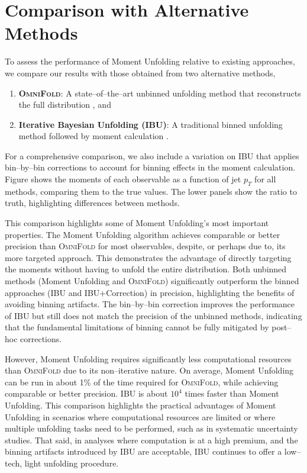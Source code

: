 \section{Comparison with Alternative Methods}
    To assess the performance of Moment Unfolding relative to existing approaches, we compare our results with those obtained from two alternative methods,
    \begin{enumerate}
        \item \textbf{\textsc{OmniFold}}: A state--of--the--art unbinned unfolding method that reconstructs the full distribution , and 
        \item \textbf{Iterative Bayesian Unfolding (IBU)}: A traditional binned unfolding method followed by moment calculation .
    \end{enumerate}
    For a comprehensive comparison, we also include a variation on IBU that applies bin--by--bin corrections to account for binning effects in the moment calculation.
    Figure  shows the moments of each observable as a function of jet $p_T$ for all methods, comparing them to the true values.
    The lower panels show the ratio to truth, highlighting differences between methods.

    This comparison highlights some of Moment Unfolding's most important properties.
    The Moment Unfolding algorithm achieves comparable or better precision than \textsc{\textsc{OmniFold}} for most observables, despite, or perhaps due to, its more targeted approach.
    This demonstrates the advantage of directly targeting the moments without having to unfold the entire distribution.
    Both unbinned methods (Moment Unfolding and \textsc{\textsc{OmniFold}}) significantly outperform the binned approaches (IBU and IBU+Correction) in precision, highlighting the benefits of avoiding binning artifacts.
    The bin--by--bin correction improves the performance of IBU but still does not match the precision of the unbinned methods, indicating that the fundamental limitations of binning cannot be fully mitigated by post--hoc corrections.
    
    However, Moment Unfolding requires significantly less computational resources than \textsc{\textsc{OmniFold}} due to its non--iterative nature.
    On average, Moment Unfolding can be run in about 1\% of the time required for \textsc{\textsc{OmniFold}}, while achieving comparable or better precision.
    IBU is about \(10^4\) times faster than Moment Unfolding.
    This comparison highlights the practical advantages of Moment Unfolding in scenarios where computational resources are limited or where multiple unfolding tasks need to be performed, such as in systematic uncertainty studies.
    That said, in analyses where computation is at a high premium, and the binning artifacts introduced by IBU are acceptable, IBU continues to offer a low--tech, light unfolding procedure.

